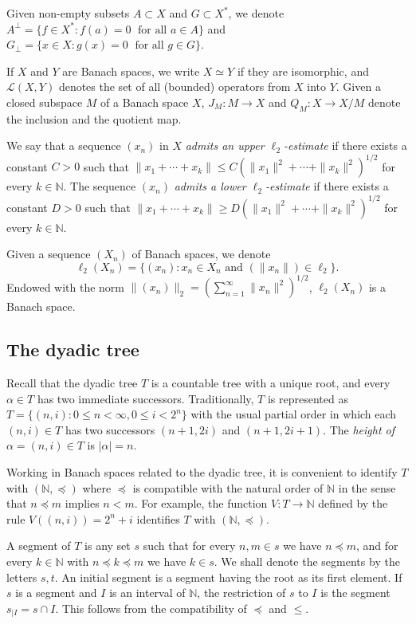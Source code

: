 \documentclass[12pt]{amsart}
\theoremstyle{plain}
\numberwithin{equation}{section}
\newcommand{\N}{\mathbb{N}}
\newcommand{\Lc}{\mathcal{L}}
\begin{document}
Given non-empty subsets $A\subset X$ and $G\subset X^*$, we denote
$A^\perp= \{f\in X^* : f(a)=0\; \textrm{ for all } a\in A\}$ and $G_\perp= \{x\in X : g(x)=0\; \textrm{ for all } g\in G\}$.

If $X$ and $Y$ are Banach spaces, we write $X\simeq Y$ if they are isomorphic, and $\Lc(X,Y)$ denotes the set of all (bounded) operators from $X$ into $Y$.
Given a closed subspace $M$ of a Banach space $X$, $J_M:M\to X$ and $Q_M:X\to X/M$ denote the inclusion and the quotient map.


We say that a sequence $(x_n)$ in $X$ \emph{admits an upper $\ell_2$-estimate} if there exists a constant $C>0$ such that $\|x_1+\cdots+ x_k\| \leq C(\|x_1\|^2+\cdots+\|x_k\|^2)^{1/2}$ for every $k\in\N$.
The sequence $(x_n)$ \emph{admits a lower $\ell_2$-estimate} if there exists a constant $D>0$ such that $\|x_1+\cdots+ x_k\| \geq D (\|x_1\|^2+\cdots+ \|x_k\|^2)^{1/2}$ for every $k\in\N$.

Given a sequence $(X_n)$ of Banach spaces, we denote
$$
\ell_2(X_n) =\{(x_n) : x_n\in X_n \textrm{ and } (\|x_n\|)\in\ell_2\}.
$$
Endowed with the norm $\|(x_n)\|_2 = (\sum_{n=1}^\infty \|x_n\|^2)^{1/2}$, $\ell_2(X_n)$ is a Banach space.

\subsection{The dyadic tree}
Recall that the dyadic tree $T$ is a countable tree with a unique root, and every $\alpha \in T$ has two immediate successors. Traditionally, $T$ is represented as $T=\{(n,i) : 0\leq n<\infty, 0\leq i <2^n \}$ with the usual partial order in which each $(n,i)\in T$ has two successors $(n+1,2i)$ and $(n+1,2i+1)$.
The \emph{height of} $\alpha=(n,i)\in T$ is $|\alpha|=n$.

Working in Banach spaces related to the dyadic tree, it is convenient to identify $T$ with $(\N, \preceq )$ where $\preceq$ is compatible with the natural order of $\N$ in the sense that $n \preceq m$ implies $n < m$. For example, the function $V : T \to \N$ defined by the rule $V((n,i)) = 2^n + i$ identifies $T$ with $(\N, \preceq)$.

A segment of $T$ is any set $s$ such that for every $n, m \in s$ we have $n \preceq m$, and for every $k\in \N$ with $n \preceq k \preceq m$ we have $k\in s$. We shall denote the segments by the letters $s, t$.
An initial segment is a segment having the root as its first element.
If $s$ is a segment and $I$ is an interval of $\N$, the restriction of $s$ to $I$ is the segment $s_{|I}=s\cap I$. This follows from the compatibility of $\preceq$ and $\leq$.
\end{document}
